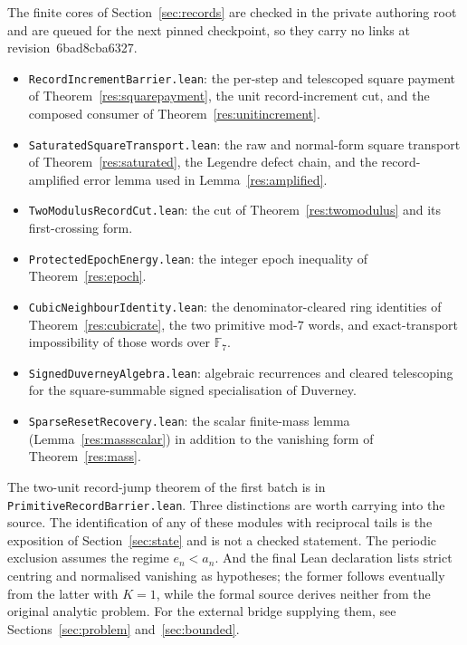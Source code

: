 \documentclass[11pt]{article}
\renewcommand{\commitshort}{6bad8cba6327}
\begin{document}
The finite cores of Section~\ref{sec:records} are checked in the private
authoring root and are queued for the next pinned checkpoint, so they carry no
links at revision~\commitshort.
\begin{itemize}
\item \texttt{RecordIncrementBarrier.lean}: the per-step and telescoped square
  payment of Theorem~\ref{res:squarepayment}, the unit record-increment cut,
  and the composed consumer of Theorem~\ref{res:unitincrement}.
\item \texttt{SaturatedSquareTransport.lean}: the raw and normal-form square
  transport of Theorem~\ref{res:saturated}, the Legendre defect chain, and the
  record-amplified error lemma used in Lemma~\ref{res:amplified}.
\item \texttt{TwoModulusRecordCut.lean}: the cut of
  Theorem~\ref{res:twomodulus} and its first-crossing form.
\item \texttt{ProtectedEpochEnergy.lean}: the integer epoch inequality of
  Theorem~\ref{res:epoch}.
\item \texttt{CubicNeighbourIdentity.lean}: the denominator-cleared ring
  identities of Theorem~\ref{res:cubicrate}, the two primitive mod-$7$ words,
  and exact-transport impossibility of those words over $\mathbb F_7$.
\item \texttt{SignedDuverneyAlgebra.lean}: algebraic recurrences and cleared
  telescoping for the square-summable signed specialisation of Duverney.
\item \texttt{SparseResetRecovery.lean}: the scalar finite-mass lemma
  (Lemma~\ref{res:massscalar}) in addition to the vanishing form of
  Theorem~\ref{res:mass}.
\end{itemize}
The two-unit record-jump theorem of the first batch is in
\texttt{PrimitiveRecordBarrier.lean}.  Three distinctions are worth carrying into
the source.  The
identification of any of these modules with reciprocal tails is the exposition
of Section~\ref{sec:state} and is not a checked statement.  The periodic exclusion
assumes the regime $e_n<a_n$.  And the final Lean declaration lists strict
centring and normalised vanishing as hypotheses; the former follows eventually
from the latter with $K=1$, while the formal source derives neither from the
original analytic problem.  For the external bridge supplying them,
see Sections~\ref{sec:problem} and~\ref{sec:bounded}.

\iffalse
\end{document}
